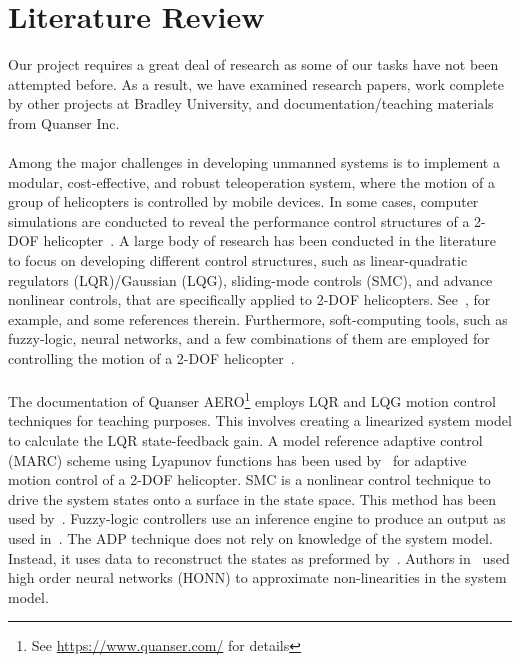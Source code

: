 \section{Literature Review}
Our project requires a great deal of research as some of our tasks have not been attempted before.  As a result, we have examined research papers, work complete by other projects at Bradley University, and documentation/teaching materials from Quanser Inc.\\
\\
Among the major challenges in developing unmanned systems is to implement a modular, cost-effective, and robust teleoperation system, where the motion of a group of helicopters is controlled by mobile devices. In some cases, computer simulations are conducted to reveal the performance control structures of a 2-DOF helicopter~\cite{DArpino2010}. A large body of research has been conducted in the literature to focus on developing different control structures, such as linear-quadratic regulators (LQR)/Gaussian (LQG), sliding-mode controls (SMC), and advance nonlinear controls, that are specifically applied to 2-DOF helicopters. See~\cite{Subramanian2016-Robust,Ahmed2010-Sliding}, for example, and some references therein. Furthermore,  soft-computing tools, such as fuzzy-logic, neural networks, and a few combinations of them are employed for controlling the motion of a 2-DOF helicopter~\cite{Chang2017-Fuzzy,Kayacan2016-Fuzzy,Gao2016-DataDriven,Hernandez2012-Decentralized}.\\
\\
The documentation of Quanser AERO\footnote{See \href{https://www.quanser.com/}{https://www.quanser.com/} for details} employs LQR and LQG motion control techniques for teaching purposes.  This involves creating a linearized system model to calculate the LQR state-feedback gain.  A model reference adaptive control (MARC) scheme using Lyapunov functions has been used by~\cite{Subramanian2016-Robust} for adaptive motion control of a 2-DOF helicopter.  SMC is a nonlinear control technique to drive the system states onto a surface in the state space.  This method has been used  by~\cite{Ahmed2010-Sliding}.  Fuzzy-logic controllers use an inference engine to produce an output as used in~\cite{Chang2017-Fuzzy,Kayacan2016-Fuzzy}.  The ADP technique does not rely on knowledge of the system model.  Instead, it uses data to reconstruct the states as preformed by~\cite{Gao2016-DataDriven}.  Authors in~\cite{Hernandez2012-Decentralized} used high order neural networks (HONN) to approximate non-linearities in the system model.\\
